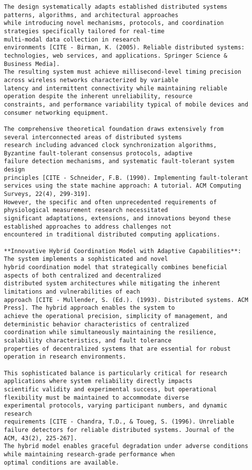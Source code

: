 \documentclass[11pt,a4paper]{report}
\begin{document}
\begin{verbatim}
The design systematically adapts established distributed systems patterns, algorithms, and architectural approaches
while introducing novel mechanisms, protocols, and coordination strategies specifically tailored for real-time
multi-modal data collection in research
environments [CITE - Birman, K. (2005). Reliable distributed systems: technologies, web services, and applications. Springer Science & Business Media].
The resulting system must achieve millisecond-level timing precision across wireless networks characterized by variable
latency and intermittent connectivity while maintaining reliable operation despite the inherent unreliability, resource
constraints, and performance variability typical of mobile devices and consumer networking equipment.

The comprehensive theoretical foundation draws extensively from several interconnected areas of distributed systems
research including advanced clock synchronization algorithms, Byzantine fault-tolerant consensus protocols, adaptive
failure detection mechanisms, and systematic fault-tolerant system design
principles [CITE - Schneider, F.B. (1990). Implementing fault-tolerant services using the state machine approach: A tutorial. ACM Computing Surveys, 22(4), 299-319].
However, the specific and often unprecedented requirements of physiological measurement research necessitated
significant adaptations, extensions, and innovations beyond these established approaches to address challenges not
encountered in traditional distributed computing applications.

**Innovative Hybrid Coordination Model with Adaptive Capabilities**: The system implements a sophisticated and novel
hybrid coordination model that strategically combines beneficial aspects of both centralized and decentralized
distributed system architectures while mitigating the inherent limitations and vulnerabilities of each
approach [CITE - Mullender, S. (Ed.). (1993). Distributed systems. ACM Press]. The hybrid approach enables the system to
achieve the operational precision, simplicity of management, and deterministic behavior characteristics of centralized
coordination while simultaneously maintaining the resilience, scalability characteristics, and fault tolerance
properties of decentralized systems that are essential for robust operation in research environments.

This sophisticated balance is particularly critical for research applications where system reliability directly impacts
scientific validity and experimental success, but operational flexibility must be maintained to accommodate diverse
experimental protocols, varying participant numbers, and dynamic research
requirements [CITE - Chandra, T.D., & Toueg, S. (1996). Unreliable failure detectors for reliable distributed systems. Journal of the ACM, 43(2), 225-267].
The hybrid model enables graceful degradation under adverse conditions while maintaining research-grade performance when
optimal conditions are available.


\end{verbatim}
\end{document}
